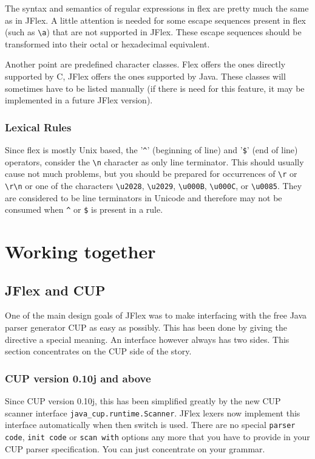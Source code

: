 \documentclass[11pt]{scrartcl}
\begin{document}
The syntax and semantics of regular expressions in flex are pretty much the
same as in JFlex. A little attention is needed for some escape sequences 
present in flex (such as \verb+\a+) that are not supported in JFlex. These
escape sequences should be transformed into their octal or hexadecimal 
equivalent. 

Another point are predefined character classes. Flex offers the ones directly
supported by C, JFlex offers the ones supported by Java. These classes will
sometimes have to be listed manually (if there is need for this feature, it
may be implemented in a future JFlex version).

\subsubsection{Lexical Rules}
Since flex is mostly Unix based, the '\verb+^+' (beginning of line) and
'\verb+$+' (end of line) operators, consider the \verb+\n+ character as %
only line terminator. This should usually cause not much problems, but you
should be prepared for occurrences of \verb+\r+ or \verb+\r\n+ or one of
the characters \verb+\u2028+, \verb+\u2029+, \verb+\u000B+, \verb+\u000C+, 
or \verb+\u0085+. They are considered to be line terminators in Unicode and 
therefore may not be consumed when 
\verb+^+ or \verb+$+ is present in a rule.%

\section{Working together\label{WorkingTog}}

\subsection{JFlex and CUP\label{CUPWork}}
One of the main design goals of JFlex was to make interfacing with the free
Java parser generator CUP \cite{CUP} as easy as possibly. 
This has been done by giving
the \texttt{} directive a special meaning. An
interface however always has two sides. This section concentrates on the
CUP side of the story.

\subsubsection{CUP version 0.10j and above}
Since CUP version 0.10j, this has been simplified greatly by the new 
CUP scanner interface \texttt{java\_cup.runtime.Scanner}. JFlex lexers now implement
this interface automatically when then \texttt{}
switch is used. There are no special \texttt{parser code}, \texttt{init
  code} or \texttt{scan with} options any more that you have to provide
in your CUP parser specification. You can just concentrate on your grammar.
\end{document}
